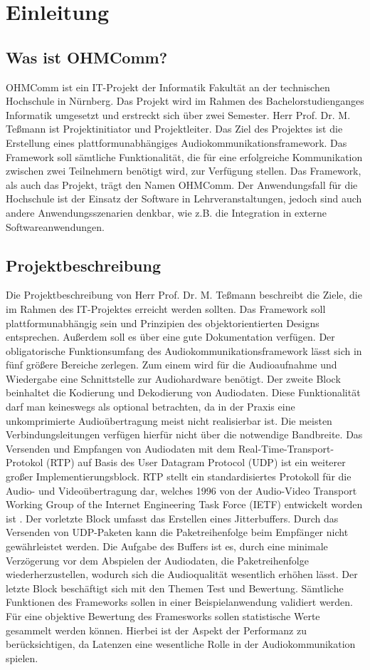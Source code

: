 \chapter{Einleitung}
\section{Was ist OHMComm?}
OHMComm ist ein IT-Projekt der Informatik Fakultät an der technischen Hochschule in Nürnberg. Das Projekt wird im Rahmen des Bachelorstudienganges Informatik umgesetzt und erstreckt sich über zwei Semester. Herr Prof. Dr. M. Teßmann ist Projektinitiator und Projektleiter. Das Ziel des Projektes ist die Erstellung eines plattformunabhängiges Audiokommunikationsframework. Das Framework soll sämtliche Funktionalität, die für eine erfolgreiche Kommunikation zwischen zwei Teilnehmern benötigt wird, zur Verfügung stellen. Das Framework, als auch das Projekt, trägt den Namen OHMComm. Der Anwendungsfall für die Hochschule ist der Einsatz der Software in Lehrveranstaltungen, jedoch sind auch andere Anwendungsszenarien denkbar, wie z.B. die Integration in externe Softwareanwendungen.

\section{Projektbeschreibung}
Die Projektbeschreibung von Herr Prof. Dr. M. Teßmann beschreibt die Ziele, die im Rahmen des IT-Projektes erreicht werden sollten. Das Framework soll plattformunabhängig sein und Prinzipien des objektorientierten Designs entsprechen. Außerdem soll es über eine gute Dokumentation verfügen.
Der obligatorische Funktionsumfang des Audiokommunikationsframework lässt sich in fünf größere Bereiche zerlegen. 
Zum einem wird für die Audioaufnahme und Wiedergabe eine Schnittstelle zur Audiohardware benötigt. 
Der zweite Block beinhaltet die Kodierung und Dekodierung von Audiodaten. Diese Funktionalität darf man keineswegs als optional betrachten, da in der Praxis eine unkomprimierte Audioübertragung meist nicht realisierbar ist. Die meisten Verbindungsleitungen verfügen hierfür nicht über die notwendige Bandbreite. 
Das Versenden und Empfangen von Audiodaten mit dem Real-Time-Transport-Protokol (RTP) auf Basis des User Datagram Protocol (UDP) ist ein weiterer großer Implementierungsblock. RTP stellt ein standardisiertes Protokoll für die Audio- und Videoübertragung dar, welches 1996 von der Audio-Video Transport Working Group of the Internet Engineering Task Force (IETF) entwickelt worden ist \cite{RFC3550}. 
Der vorletzte Block umfasst das Erstellen eines Jitterbuffers. Durch das Versenden von UDP-Paketen kann die Paketreihenfolge beim Empfänger nicht gewährleistet werden. Die Aufgabe des Buffers ist es, durch eine minimale Verzögerung vor dem Abspielen der Audiodaten, die Paketreihenfolge wiederherzustellen, wodurch sich die Audioqualität wesentlich erhöhen lässt.
Der letzte Block beschäftigt sich mit den Themen Test und Bewertung. Sämtliche Funktionen des Frameworks sollen in einer Beispielanwendung validiert werden. Für eine objektive Bewertung des Framesworks sollen statistische Werte gesammelt werden können. Hierbei ist der Aspekt der Performanz zu berücksichtigen, da Latenzen eine wesentliche Rolle in der Audiokommunikation spielen.
	
